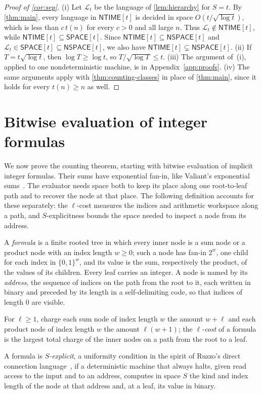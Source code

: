 \documentclass[11pt]{article}
\theoremstyle{definition}
\theoremstyle{definition}
\theoremstyle{remark}
\newcommand{\NTIME}{\mathsf{NTIME}}
\newcommand{\SPACE}{\mathsf{SPACE}}
\newcommand{\NSPACE}{\mathsf{NSPACE}}
\begin{document}
\begin{proof}[Proof of \cref{cor:sep}]
(i) Let $\mathcal L_t$ be the language of \cref{lem:hierarchy} for $S=t$. By \cref{thm:main}, every language in $\NTIME[t]$ is decided in space $O(t/\sqrt{\log t})$, which is less than $c\,t(n)$ for every $c>0$ and all large $n$. Thus $\mathcal L_t\notin\NTIME[t]$, while $\NTIME[t]\subseteq\SPACE[t]$. Since $\NTIME[t]\subseteq\NSPACE[t]$ and $\mathcal L_t\in\SPACE[t]\subseteq\NSPACE[t]$, we also have $\NTIME[t]\subsetneq\NSPACE[t]$. (ii) If $T=t\sqrt{\log t}$, then $\log T\ge\log t$, so $T/\sqrt{\log T}\le t$. (iii) The argument of~(i), applied to one nondeterministic machine, is in Appendix~\ref{app:proofs}. (iv) The same arguments apply with \cref{thm:counting-classes} in place of \cref{thm:main}, since it holds for every $t(n)\ge n$ as well.
\end{proof}

\section{Bitwise evaluation of integer formulas}\label{sec:formulas}

We now prove the counting theorem, starting with bitwise evaluation of implicit integer formulas. Their sums have exponential fan-in, like Valiant's exponential sums~\cite{Val79}. The evaluator needs space both to keep its place along one root-to-leaf path and to recover the node at that place. The following definition accounts for these separately: the $\ell$-cost measures the indices and arithmetic workspace along a path, and $S$-explicitness bounds the space needed to inspect a node from its address.

\begin{definition}\label{def:formula}
A \emph{formula} is a finite rooted tree in which every inner node is a sum node or a product node with an index length $w\ge0$; such a node has fan-in $2^w$, one child for each index in $\{0,1\}^w$, and its value is the sum, respectively the product, of the values of its children. Every leaf carries an integer. A node is named by its \emph{address}, the sequence of indices on the path from the root to it, each written in binary and preceded by its length in a self-delimiting code, so that indices of length $0$ are visible.

For $\ell\ge1$, charge each sum node of index length $w$ the amount $w+\ell$ and each product node of index length $w$ the amount $\ell(w+1)$; the \emph{$\ell$-cost} of a formula is the largest total charge of the inner nodes on a path from the root to a leaf.

A formula is \emph{$S$-explicit}, a uniformity condition in the spirit of Ruzzo's direct connection language~\cite{Ruz81}, if a deterministic machine that always halts, given read access to the input and to an address, computes in space $S$ the kind and index length of the node at that address and, at a leaf, its value in binary.
\end{definition}
\end{document}
